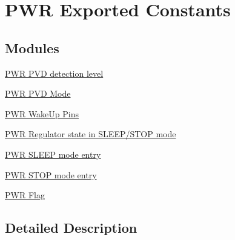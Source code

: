 \hypertarget{group___p_w_r___exported___constants}{}\section{P\+WR Exported Constants}
\label{group___p_w_r___exported___constants}
\subsection*{Modules}
\begin{DoxyCompactItemize}
\item 
\hyperlink{group___p_w_r___p_v_d__detection__level}{P\+W\+R P\+V\+D detection level}
\item 
\hyperlink{group___p_w_r___p_v_d___mode}{P\+W\+R P\+V\+D Mode}
\item 
\hyperlink{group___p_w_r___wake_up___pins}{P\+W\+R Wake\+Up Pins}
\item 
\hyperlink{group___p_w_r___regulator__state__in___s_l_e_e_p___s_t_o_p__mode}{P\+W\+R Regulator state in S\+L\+E\+E\+P/\+S\+T\+O\+P mode}
\item 
\hyperlink{group___p_w_r___s_l_e_e_p__mode__entry}{P\+W\+R S\+L\+E\+E\+P mode entry}
\item 
\hyperlink{group___p_w_r___s_t_o_p__mode__entry}{P\+W\+R S\+T\+O\+P mode entry}
\item 
\hyperlink{group___p_w_r___flag}{P\+W\+R Flag}
\end{DoxyCompactItemize}


\subsection{Detailed Description}
